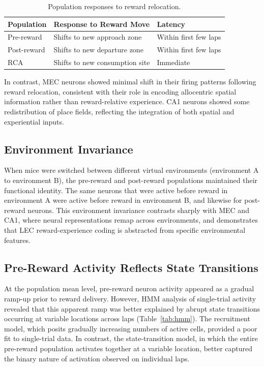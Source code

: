 \documentclass[12pt]{article}
\begin{document}
\begin{table}[ht]
\centering
\caption{Population responses to reward relocation.}
\label{tab:relocation}
\begin{tabular}{lll}
\toprule
Population & Response to Reward Move & Latency \\
\midrule
Pre-reward & Shifts to new approach zone & Within first few laps \\
Post-reward & Shifts to new departure zone & Within first few laps \\
RCA & Shifts to new consumption site & Immediate \\
\bottomrule
\end{tabular}
\end{table}

In contrast, MEC neurons showed minimal shift in their firing patterns following reward relocation, consistent with their role in encoding allocentric spatial information rather than reward-relative experience. CA1 neurons showed some redistribution of place fields, reflecting the integration of both spatial and experiential inputs.

\subsection{Environment Invariance}

When mice were switched between different virtual environments (environment A to environment B), the pre-reward and post-reward populations maintained their functional identity. The same neurons that were active before reward in environment A were active before reward in environment B, and likewise for post-reward neurons. This environment invariance contrasts sharply with MEC and CA1, where neural representations remap across environments, and demonstrates that LEC reward-experience coding is abstracted from specific environmental features.

\subsection{Pre-Reward Activity Reflects State Transitions}

At the population mean level, pre-reward neuron activity appeared as a gradual ramp-up prior to reward delivery. However, HMM analysis of single-trial activity revealed that this apparent ramp was better explained by abrupt state transitions occurring at variable locations across laps (Table~\ref{tab:hmm}). The recruitment model, which posits gradually increasing numbers of active cells, provided a poor fit to single-trial data. In contrast, the state-transition model, in which the entire pre-reward population activates together at a variable location, better captured the binary nature of activation observed on individual laps.
\end{document}
